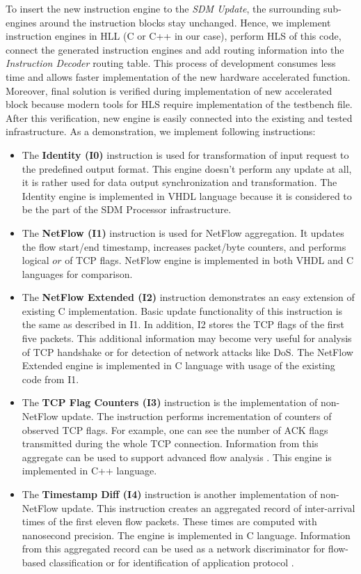 To insert the new instruction engine to the \textit{SDM Update}, the surrounding sub-engines around the instruction blocks stay 
unchanged.
Hence, we implement instruction engines in HLL (C or C++ in our case), perform HLS of this code, connect 
the generated instruction engines and add routing information into the \textit{Instruction Decoder} routing table.
This process of development consumes less time and allows faster implementation of the new hardware accelerated function.
Moreover, final solution is verified during implementation of new accelerated block because modern tools
for HLS require implementation of the testbench file.
After this verification, new engine is easily connected into the existing and tested infrastructure.
As a demonstration, we implement following instructions:
\begin{itemize}
\item The \textbf{Identity (I0)} instruction is used for transformation of input request to the predefined output format.
This engine doesn't perform any update at all, it is rather used for data output synchronization and transformation. The Identity
engine is implemented in VHDL language because it is considered to be the part of the SDM Processor infrastructure.
\item The \textbf{NetFlow (I1)} instruction is used for NetFlow aggregation. It updates the flow start/end timestamp, 
increases packet/byte counters, and performs logical $or$ of TCP flags. NetFlow engine is implemented in both VHDL and C languages for comparison.
\item The \textbf{NetFlow Extended (I2)} instruction demonstrates an easy extension of existing C implementation.
Basic update functionality of this instruction is the same as described in I1. In addition, I2 stores the TCP flags of the first five packets.
This additional information may become very useful for analysis of TCP handshake or for 
detection of network attacks like DoS. The NetFlow Extended engine is implemented in C language with usage of the existing code from I1.   
\item The \textbf{TCP Flag Counters (I3)} instruction is the implementation of non-NetFlow update. 
The instruction performs incrementation of counters of observed TCP flags.
For example, one can see the number of ACK flags transmitted during the whole TCP connection.
Information from this aggregate can be used to support advanced flow analysis \cite{Moore05discriminatorsfor}.
This engine is implemented in C++ language.
\item The \textbf{Timestamp Diff (I4)} instruction is another implementation of non-NetFlow update.
This instruction creates an aggregated record of inter-arrival times of the first eleven flow packets. 
These times are computed with nanosecond precision. 
The engine is implemented in C language. Information from this
aggregated record can be used as a network discriminator for flow-based classification \cite{Moore05discriminatorsfor} 
or for identification of application protocol \cite{Piskac2011DynamicsOfNetworkServices}. 
\end{itemize}

